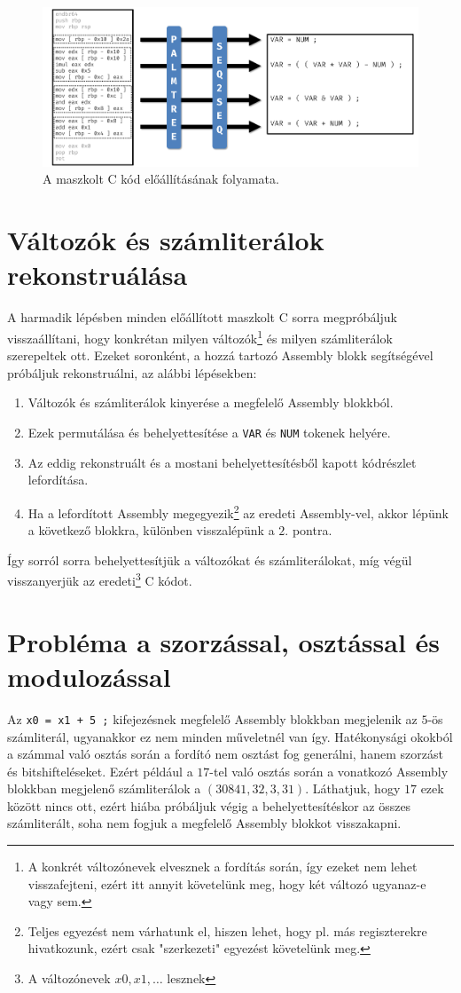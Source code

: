 \begin{figure}[H]
	\centering
	\includegraphics[width=1\textwidth]{images/translation_fig.pdf}
	\caption{A maszkolt C kód előállításának folyamata.}
	\label{fig:translation_fig}
\end{figure}

\section{Változók és számliterálok rekonstruálása}
A harmadik lépésben minden előállított maszkolt C sorra megpróbáljuk
visszaállítani, hogy konkrétan milyen változók\footnote{A konkrét változónevek
elvesznek a fordítás során, így ezeket nem lehet visszafejteni, ezért itt
annyit követelünk meg, hogy két változó ugyanaz-e vagy sem.} és milyen
számliterálok szerepeltek ott. Ezeket soronként, a hozzá tartozó Assembly blokk
segítségével próbáljuk rekonstruálni, az alábbi lépésekben:
\begin{enumerate}
    \item Változók és számliterálok kinyerése a megfelelő Assembly blokkból.
    \item Ezek permutálása és behelyettesítése a \texttt{VAR} és \texttt{NUM}
    tokenek helyére.
    \item Az eddig rekonstruált és a mostani behelyettesítésből kapott kódrészlet lefordítása.
    \item Ha a lefordított Assembly megegyezik\footnote{Teljes egyezést nem
    várhatunk el, hiszen lehet, hogy pl. más regiszterekre hivatkozunk, ezért
    csak "szerkezeti" egyezést követelünk meg.} az eredeti Assembly-vel, akkor
    lépünk a következő blokkra, különben visszalépünk a $2.$ pontra.
\end{enumerate}
Így sorról sorra behelyettesítjük a változókat és számliterálokat, míg végül
visszanyerjük az eredeti\footnote{A változónevek $x0,x1,\dots$ lesznek}
C kódot.

\section{Probléma a szorzással, osztással és modulozással}
Az \texttt{x0 = x1 + 5 ;} kifejezésnek megfelelő Assembly blokkban 
megjelenik az $5$-ös számliterál, ugyanakkor ez nem minden műveletnél van így.
Hatékonysági okokból a számmal való osztás során a fordító nem osztást fog
generálni, hanem szorzást és bitshifteléseket. Ezért például a $17$-tel való
osztás során a vonatkozó Assembly blokkban megjelenő számliterálok a $(30841, 32, 3, 31)$.
Láthatjuk, hogy $17$ ezek között nincs ott, ezért hiába próbáljuk végig
a behelyettesítéskor az összes számliterált, soha nem fogjuk a megfelelő Assembly
blokkot visszakapni.

